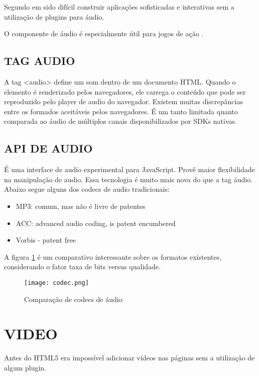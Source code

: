 Segundo \cite{browserGamesTechnologyAndFuture} em sido difícil
construir aplicações sofisticadas e interativas sem a utilização de
plugins para áudio.

O componente de áudio é especialmente útil para jogos de ação
\autocite{browserGamesTechnologyAndFuture}.

\subsection{TAG AUDIO}

A tag <audio> define um som dentro de um documento HTML. Quando o
elemento é renderizado pelos navegadores, ele carrega o conteúdo que
pode ser reproduzido pelo player de audio do navegador. Existem muitas
discrepâncias entre os formados aceitáveis pelos navegadores. É um
tanto limitada quanto comparada ao áudio de múltiplos canais
disponibilizados por SDKs nativas.

\subsection{API DE AUDIO}

É uma interface de audio experimental para JavaScript. Provê maior
flexibilidade na manipulação de audio. Essa tecnologia é muito mais
nova do que a tag áudio.
Abaixo segue alguns dos codecs de audio tradicionais:

\begin{itemize}
    \item{MP3: comum, mas não é livre de patentes}
    \item{ACC: advanced audio coding, is patent encumbered} \item{Vorbis - patent free}
\end{itemize}

A figura \ref{fig:audioCodecs} é um comparativo interessante sobre os
formatos existentes, considerando o fator taxa de bits versus qualidade.

\begin{figure}
    \centering
    \texttt{[image: codec.png]}
	\caption{Comparação de codecs de áudio}
    \label{fig:audioCodecs}
\end{figure}


\section{VIDEO}
Antes do HTML5 era impossível adicionar vídeos nas páginas sem a utilização de algum plugin.

